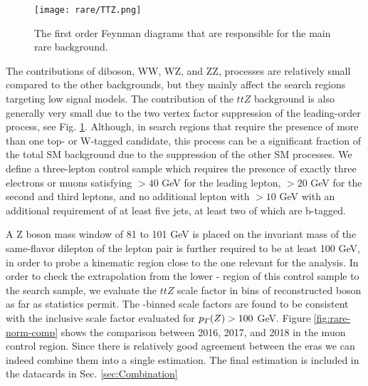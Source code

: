 \begin{figure}
	\begin{center}
  \texttt{[image: rare/TTZ.png]}
	\end{center}
	\caption[Diboson and $ttZ$ Feynman Diagrams]{The first order Feynman diagrams that are responsible for the main rare background.}
	\label{fig:rare-feynman-diagrams}
\end{figure}

The contributions of diboson, WW, WZ, and ZZ, processes are relatively small compared to the other backgrounds, but they mainly affect the search regions targeting low \dm{} signal models. The contribution of the $ttZ$ background is also generally very small due to the two vertex factor suppression of the leading-order process, see Fig. \ref{fig:rare-feynman-diagrams}. Although, in search regions that require the presence of more than one top- or W-tagged candidate, this process can be a significant fraction of the total SM background due to the suppression of the other SM processes. We define a three-lepton control sample which requires the presence of exactly three electrons or muons satisfying \pt$>40$ GeV for the leading lepton, \pt$>20$ GeV for the second and third leptons, and no additional lepton with \pt$>10$ GeV with an additional requirement of at least five jets, at least two of which are b-tagged. 

A Z boson mass window of 81 to 101 GeV is placed on the invariant mass of the same-flavor dilepton \pt{} of the lepton pair is further required to be at least 100 GeV, in order to probe a kinematic region close to the one relevant for the analysis. In order to check the extrapolation from the lower \Z-\pt{} region of this control sample to the search sample, we evaluate the $ttZ$ scale factor in bins of reconstructed \Z{} boson \pt{} as far as statistics permit. The \pt-binned scale factors are found to be consistent with the inclusive scale factor evaluated for $p_{T}(Z)>100$ GeV. Figure \ref{fig:rare-norm-comp} shows the comparison between 2016, 2017, and 2018 in the muon control region. Since there is relatively good agreement between the eras we can indeed combine them into a single estimation. The final estimation is included in the datacards in Sec. \ref{sec:Combination}


